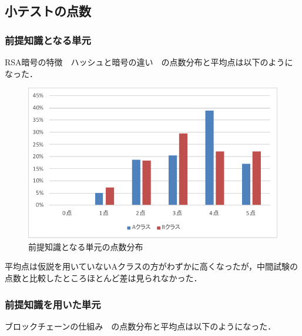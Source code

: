 \documentclass[a4j,12pt]{jsarticle}
\begin{document}
\newpage
\subsection{小テストの点数}
\subsubsection{前提知識となる単元}
RSA暗号の特徴　ハッシュと暗号の違い　の点数分布と平均点は以下のようになった．

\begin{figure}[H]
\centering
\includegraphics[width=12cm]{12test.pdf}
\caption{前提知識となる単元の点数分布}
\label{fig:no}
\end{figure} 

\begin{table}[H]
\centering
{}
\caption{前提知識となる単元の平均点の比較}
\label{fig:12ank}
\end{table}

平均点は仮説を用いていないAクラスの方がわずかに高くなったが，中間試験の点数と比較したところほとんど差は見られなかった．

\newpage
\subsubsection{前提知識を用いた単元}
ブロックチェーンの仕組み　の点数分布と平均点は以下のようになった．
\end{document}
